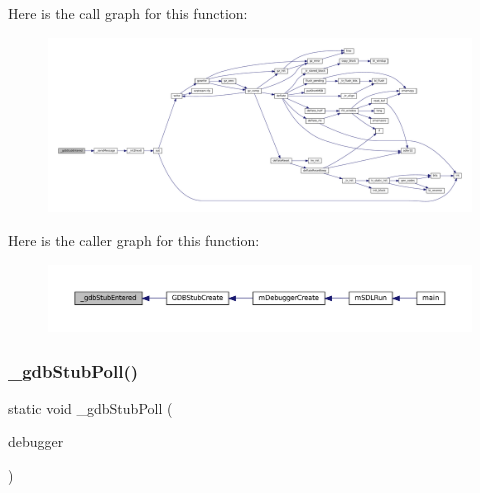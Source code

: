 Here is the call graph for this function\+:
\nopagebreak
\begin{figure}[H]
\begin{center}
\leavevmode
\includegraphics[width=350pt]{gdb-stub_8c_a409655c77fda26ad161b9097e7d4130e_cgraph}
\end{center}
\end{figure}
Here is the caller graph for this function\+:
\nopagebreak
\begin{figure}[H]
\begin{center}
\leavevmode
\includegraphics[width=350pt]{gdb-stub_8c_a409655c77fda26ad161b9097e7d4130e_icgraph}
\end{center}
\end{figure}
\mbox{\label{gdb-stub_8c_ae58295c549402f4ef20ff8aad2c5dfeb}} 
\subsubsection{\texorpdfstring{\+\_\+gdb\+Stub\+Poll()}{\_gdbStubPoll()}}
{\footnotesize\ttfamily static void \+\_\+gdb\+Stub\+Poll (\begin{DoxyParamCaption}\item[{struct m\+Debugger $\ast$}]{debugger }\end{DoxyParamCaption})\hspace{0.3cm}{\ttfamily [static]}}

